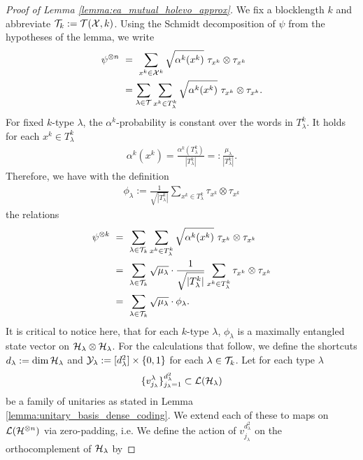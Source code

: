 \begin{proof}[Proof of Lemma \ref{lemma:ea_mutual_holevo_approx}]
We fix a blocklength $k$ and abbreviate ${\mathcal T}_k := {\mathcal T}({\mathcal X},k)$. Using the Schmidt decomposition of $\psi$
from the hypotheses of the lemma, we write 
\begin{align*}
\psi^{\otimes n} \ 
&= \ \sum_{x^k \in \cX^k} \sqrt{\alpha^k(x^k)} \ \tau_{x^k} \otimes \tau_{x^k} \\
&= \sum_{\lambda \in \cT} \sum_{x^k \in T_\lambda^k} \sqrt{\alpha^k(x^k)} \ \tau_{x^k} \otimes \tau_{x^k}.
\end{align*}
For fixed $k$-type $\lambda$, the $\alpha^k$-probability is constant over the words in $T_\lambda^k$. It 
holds for each $x^k \in T_\lambda^k$
\begin{align*}
\alpha^k(x^k) = \frac{\alpha^k(T_\lambda^k)}{|T_\lambda^k|} =: \frac{\mu_{\lambda}}{|T_\lambda^k|}.
\end{align*}
Therefore, we have with the definition 
\begin{align*}
\phi_\lambda := \frac{1}{\sqrt{|T_\lambda^k|}} \sum_{x^k \in T_\lambda^k} \tau_{x^k} \otimes \tau_{x^k}
\end{align*}
the relations
\begin{align}
\psi^{\otimes k} \
&= \ \sum_{\lambda \in {\mathcal T}_k} \sum_{x^k \in T_\lambda^k} \sqrt{\alpha^k(x^k)} \ \tau_{x^k} \otimes \tau_{x^k} \nonumber \\
&= \ \sum_{\lambda \in {\mathcal T}_k} \sqrt{\mu_\lambda}\cdot \frac{1}{\sqrt{|T_\lambda^k|}} \sum_{x^k \in T_\lambda^k} \tau_{x^k} \otimes \tau_{x^k} \nonumber \\
&= \ \sum_{\lambda \in {\mathcal T}_k} \sqrt{\mu_\lambda}\cdot \phi_\lambda. \label{lemma:ea_mutual_holevo_approx_2}
\end{align}
It is critical to notice here, that for each $k$-type $\lambda$, $\phi_\lambda$ is a maximally entangled state vector on ${\mathcal H}_\lambda \otimes {\mathcal H}_\lambda$. For the calculations that follow, we define the shortcuts $d_\lambda := \dim {\mathcal H}_\lambda$ and ${\mathcal Y}_\lambda := [d_\lambda^2] \times \{0,1\}$ for each $\lambda \in {\mathcal T}_k$. \newline
Let for each type $\lambda$
\begin{align*}
\{v_{j_\lambda}^{\lambda} \}_{j_\lambda = 1}^{d_\lambda^2} \subset {\mathcal L}({\mathcal H}_\lambda)
\end{align*}
be a family of unitaries as stated in Lemma \ref{lemma:unitary_basis_dense_coding}. We extend each of these to maps on ${\mathcal L}({\mathcal H}^{\otimes n})$ via zero-padding, i.e. 
We define the action of $v_{j_\lambda}^{d_\lambda^2}$ on the orthocomplement of ${\mathcal H}_\lambda$ by

\end{proof}
